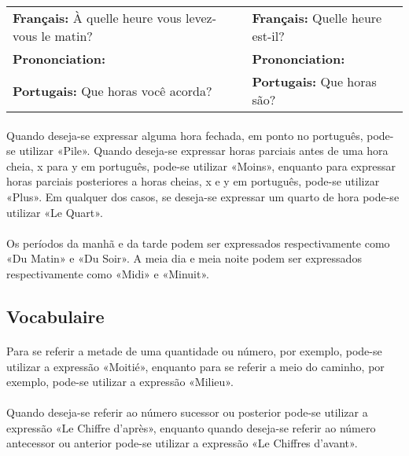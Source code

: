 \documentclass{article}
\begin{document}
            \begin{center}
                \begin{tabular}{m{8cm} m{8cm}}
                    \textbf{Français:}      À quelle heure vous levez-vous le matin? & \textbf{Français:}      Quelle heure est-il?\\
                    \textbf{Prononciation:}                                          & \textbf{Prononciation:} \\
                    \textbf{Portugais:}     Que horas você acorda?                   & \textbf{Portugais:}     Que horas são?\\
                \end{tabular}
            \end{center}
                
        \paragraph{}Quando deseja-se expressar alguma hora fechada, em ponto no português, pode-se utilizar «Pile». Quando deseja-se expressar horas parciais antes de uma hora cheia, x para y em português, pode-se utilizar «Moins», enquanto para expressar horas parciais posteriores a horas cheias, x e y em português, pode-se utilizar «Plus». Em qualquer dos casos, se deseja-se expressar um quarto de hora pode-se utilizar «Le Quart».
        
        \paragraph{}Os períodos da manhã e da tarde podem ser expressados respectivamente como «Du Matin» e «Du Soir». A meia dia e meia noite podem ser expressados respectivamente como «Midi» e «Minuit».

    \subsection{Vocabulaire}
            \paragraph{}Para se referir a metade de uma quantidade ou número, por exemplo, pode-se utilizar a expressão «Moitié», enquanto para se referir a meio do caminho, por exemplo, pode-se utilizar a expressão «Milieu».
            
            \paragraph{}Quando deseja-se referir ao número sucessor ou posterior pode-se utilizar a expressão «Le Chiffre d'après», enquanto quando deseja-se referir ao número antecessor ou anterior pode-se utilizar a expressão «Le Chiffres d'avant».
            
\end{document}
